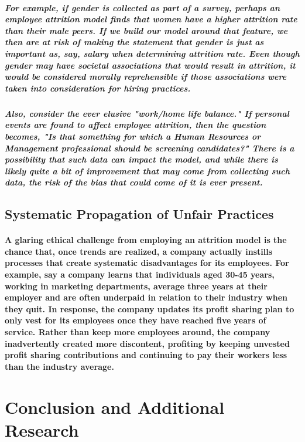 \documentclass[10pt]{article}
\begin{document}
\subparagraph{For example, if gender is collected as part of a survey, perhaps an employee attrition model finds that women have a higher attrition rate than their male peers. If we build our model around that feature, we then are at risk of making the statement that gender is just as important as, say, salary when determining attrition rate. Even though gender may have societal associations that would result in attrition, it would be considered morally reprehensible if those associations were taken into consideration for hiring practices.}
 
\subparagraph{Also, consider the ever elusive "work/home life balance." If personal events are found to affect employee attrition, then the question becomes, "Is that something for which a Human Resources or Management professional should be screening candidates?" There is a possibility that such data can impact the model, and while there is likely quite a bit of improvement that may come from collecting such data, the risk of the bias that could come of it is ever present.}
 
\subsection{Systematic Propagation of Unfair Practices}

\paragraph{A glaring ethical challenge from employing an attrition model is the chance that, once trends are realized, a company actually instills processes that create systematic disadvantages for its employees. For example, say a company learns that individuals aged 30-45 years, working in marketing departments, average three years at their employer and are often underpaid in relation to their industry when they quit. In response, the company updates its profit sharing plan to only vest for its employees once they have reached five years of service. Rather than keep more employees around, the company inadvertently created more discontent, profiting by keeping unvested profit sharing contributions and continuing to pay their workers less than the industry average.}

\section{Conclusion and Additional Research}
\end{document}
